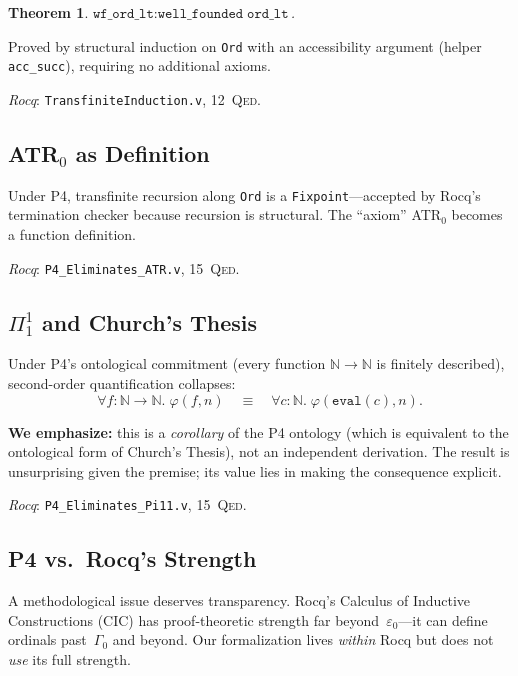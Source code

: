 \documentclass[11pt,a4paper]{article}
\newtheorem{theorem}{Theorem}[section]
\theoremstyle{definition}
\theoremstyle{remark}
\newcommand{\Qed}{\textsc{Qed}}
\begin{document}
\begin{theorem}\label{thm:wf}
$\texttt{wf\_ord\_lt} : \texttt{well\_founded}\;\texttt{ord\_lt}$.
\end{theorem}

Proved by structural induction on \texttt{Ord} with an accessibility argument (helper \texttt{acc\_succ}), requiring no additional axioms.

\emph{Rocq}: \texttt{TransfiniteInduction.v}, 12~\Qed.

\subsection{ATR$_0$ as Definition}

Under P4, transfinite recursion along \texttt{Ord} is a \texttt{Fixpoint}---accepted by Rocq's termination checker because recursion is structural.  The ``axiom'' ATR$_0$ becomes a function definition.

\emph{Rocq}: \texttt{P4\_Eliminates\_ATR.v}, 15~\Qed.

\subsection{$\Pi^1_1$ and Church's Thesis}
\label{sec:pi11}

Under P4's ontological commitment (every function $\mathbb{N} \to \mathbb{N}$ is finitely described), second-order quantification collapses:
\[
  \forall f : \mathbb{N} \to \mathbb{N}.\; \varphi(f, n)
  \quad\equiv\quad
  \forall c : \mathbb{N}.\; \varphi(\texttt{eval}(c), n).
\]

\textbf{We emphasize:} this is a \emph{corollary} of the P4 ontology (which is equivalent to the ontological form of Church's Thesis), not an independent derivation.  The result is unsurprising given the premise; its value lies in making the consequence explicit.

\emph{Rocq}: \texttt{P4\_Eliminates\_Pi11.v}, 15~\Qed.

\subsection{P4 vs.\ Rocq's Strength}
\label{sec:rocqstrength}

A methodological issue deserves transparency.  Rocq's Calculus of Inductive Constructions (CIC) has proof-theoretic strength far beyond~$\varepsilon_0$---it can define ordinals past~$\Gamma_0$ and beyond.  Our formalization lives \emph{within} Rocq but does not \emph{use} its full strength.
\end{document}
